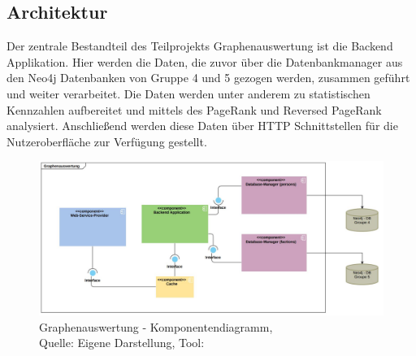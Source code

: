 \subsection{Architektur}
Der zentrale Bestandteil des Teilprojekts Graphenauswertung ist die Backend Applikation. Hier werden die Daten, die zuvor über die Datenbankmanager aus den Neo4j Datenbanken von Gruppe 4 und 5 gezogen werden, zusammen geführt und weiter verarbeitet. Die Daten werden unter anderem zu statistischen Kennzahlen aufbereitet und mittels des PageRank und Reversed PageRank analysiert. Anschließend werden diese Daten über HTTP Schnittstellen für die Nutzeroberfläche zur Verfügung gestellt.
\begin{figure}[H]
	\centering
	\includegraphics[width=450px, keepaspectratio]{logos/graphenauswertung_architektur.JPG}
	\caption{Graphenauswertung - Komponentendiagramm,\\Quelle: Eigene Darstellung, Tool: \cite{visual_paradigm}}
\end{figure}

